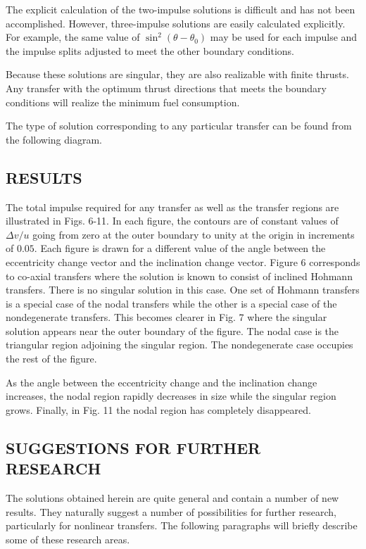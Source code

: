 \documentclass[12pt]{article}
\begin{document}
The explicit calculation of the two-impulse solutions is difficult and has not been accomplished. However, three-impulse solutions are easily calculated explicitly. For example, the same value of $ \sin^2 (\theta - \theta_0) $ may be used for each impulse and the impulse splits adjusted to meet the other boundary conditions.

Because these solutions are singular, they are also realizable with finite thrusts. Any transfer with the optimum thrust directions that meets the boundary conditions will realize the minimum fuel consumption.

The type of solution corresponding to any particular transfer can be found from the following diagram.

\subsection*{RESULTS}
The total impulse required for any transfer as well as the transfer regions are illustrated in Figs. 6-11. In each figure, the contours are of constant values of $\Delta v/u$ going from zero at the outer boundary to unity at the origin in increments of $0.05$. Each figure is drawn for a different value of the angle between the eccentricity change vector and the inclination change vector. Figure 6 corresponds to co-axial transfers where the solution is known to consist of inclined Hohmann transfers. There is no singular solution in this case. One set of Hohmann transfers is a special case of the nodal transfers while the other is a special case of the nondegenerate transfers. This becomes clearer in Fig. 7 where the singular solution appears near the outer boundary of the figure. The nodal case is the triangular region adjoining the singular region. The nondegenerate case occupies the rest of the figure.

As the angle between the eccentricity change and the inclination change increases, the nodal region rapidly decreases in size while the singular region grows. Finally, in Fig. 11 the nodal region has completely disappeared.

\subsection*{SUGGESTIONS FOR FURTHER RESEARCH}
The solutions obtained herein are quite general and contain a number of new results. They naturally suggest a number of possibilities for further research, particularly for nonlinear transfers. The following paragraphs will briefly describe some of these research areas.
\end{document}

